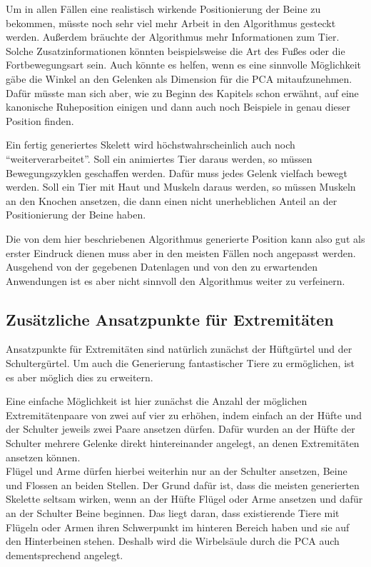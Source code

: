Um in allen Fällen eine realistisch wirkende Positionierung der Beine zu bekommen, müsste noch sehr viel mehr Arbeit in den Algorithmus gesteckt werden. Außerdem bräuchte der Algorithmus mehr Informationen zum Tier. Solche Zusatzinformationen könnten beispielsweise die Art des Fußes oder die Fortbewegungsart sein. Auch könnte es helfen, wenn es eine sinnvolle Möglichkeit gäbe die Winkel an den Gelenken als Dimension für die PCA mitaufzunehmen. Dafür müsste man sich aber, wie zu Beginn des Kapitels schon erwähnt, auf eine kanonische Ruheposition einigen und dann auch noch Beispiele in genau dieser Position finden.

Ein fertig generiertes Skelett wird höchstwahrscheinlich auch noch "`weiterverarbeitet"'. Soll \zb ein animiertes Tier daraus werden, so müssen Bewegungszyklen geschaffen werden. Dafür muss jedes Gelenk vielfach bewegt werden. Soll ein Tier mit Haut und Muskeln daraus werden, so müssen Muskeln an den Knochen ansetzen, die dann einen nicht unerheblichen Anteil an der Positionierung der Beine haben.

Die von dem hier beschriebenen Algorithmus generierte Position kann also gut als erster Eindruck dienen muss aber in den meisten Fällen noch angepasst werden. Ausgehend von der gegebenen Datenlagen und von den zu erwartenden Anwendungen ist es aber nicht sinnvoll den Algorithmus weiter zu verfeinern.

\subsection{Zusätzliche Ansatzpunkte für Extremitäten}

Ansatzpunkte für Extremitäten sind natürlich zunächst der Hüftgürtel und der Schultergürtel. Um auch die Generierung fantastischer Tiere zu ermöglichen, ist es aber möglich dies zu erweitern.

Eine einfache Möglichkeit ist hier zunächst die Anzahl der möglichen Extremitätenpaare von zwei auf vier zu erhöhen, indem einfach an der Hüfte und der Schulter jeweils zwei Paare ansetzen dürfen. Dafür wurden an der Hüfte \bzw der Schulter mehrere Gelenke direkt hintereinander angelegt, an denen Extremitäten ansetzen können.\\
Flügel und Arme dürfen hierbei weiterhin nur an der Schulter ansetzen, Beine und Flossen an beiden Stellen. Der Grund dafür ist, dass die meisten generierten Skelette seltsam wirken, wenn an der Hüfte Flügel oder Arme ansetzen und dafür an der Schulter Beine beginnen. Das liegt daran, dass existierende Tiere mit Flügeln oder Armen ihren Schwerpunkt im hinteren Bereich haben und sie auf den Hinterbeinen stehen. Deshalb wird die Wirbelsäule durch die PCA auch dementsprechend angelegt.


